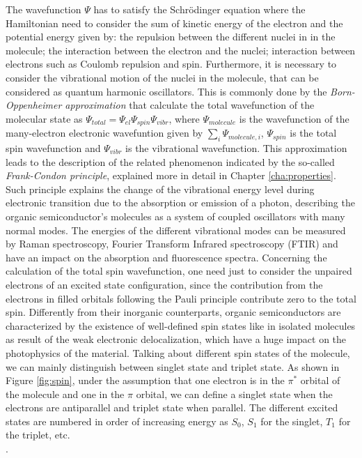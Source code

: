 \documentclass  [
  paper    = a4,
  BCOR     = 10mm,
  twoside,
  fontsize = 12pt,
  fleqn,
  toc      = bibnumbered,
  toc      = listofnumbered,
  numbers  = noendperiod,
  headings = normal,
  listof   = leveldown,
  version  = 3.03
]                                       {scrreprt}
\begin{document}
The wavefunction $\Psi$ has to satisfy the Schr\"odinger equation where the Hamiltonian need to consider the sum of kinetic energy of the electron and the potential energy given by: the repulsion between the different nuclei in in the molecule; the interaction between the electron and the nuclei; interaction between electrons such as Coulomb repulsion and spin. Furthermore, it is necessary to consider the vibrational motion of the nuclei in the molecule, that can be considered as quantum harmonic oscillators. This is commonly done by the \emph{Born-Oppenheimer approximation} that calculate the total wavefunction of the molecular state as $\Psi_{total}=\Psi_{el}\Psi_{spin}\Psi_{vibr}$, where $\Psi_{molecule}$ is the wavefunction of the many-electron electronic wavefuntion given by $\sum_{i}\Psi_{molecule,i}$, $\Psi_{spin}$ is the total spin wavefunction and $\Psi_{vibr}$ is the vibrational wavefunction. This approximation leads to the description of the related phenomenon indicated by the so-called \emph{Frank-Condon principle}, explained more in detail in Chapter \ref{cha:properties}. Such principle explains the change of the vibrational energy level during electronic transition due to the absorption or emission of a photon, describing the organic semiconductor's molecules as a system of coupled oscillators with many normal modes. The energies of the different vibrational modes can be measured by Raman spectroscopy, Fourier Transform Infrared spectroscopy (FTIR) and have an impact on the absorption and fluorescence spectra. Concerning the calculation of the total spin wavefunction, one need just to consider the unpaired electrons of an excited state configuration, since the contribution from the electrons in filled orbitals following the Pauli principle contribute zero to the total spin. Differently from their inorganic counterparts, organic semiconductors are characterized by the existence of well-defined spin states like in isolated molecules as result of the weak electronic delocalization, which have a huge impact on the photophysics of the material. Talking about different spin states of the molecule, we can mainly distinguish between singlet state and triplet state. As shown in Figure \ref{fig:spin}, under the assumption that one electron is in the $\pi^*$ orbital of the molecule and one in the $\pi$ orbital, we can define a singlet state when the electrons are antiparallel and triplet state when parallel. The different excited states are numbered in order of increasing energy as $S_0$, $S_1$ for the singlet, $T_1$ for the triplet, etc.\\
.
\end{document}
